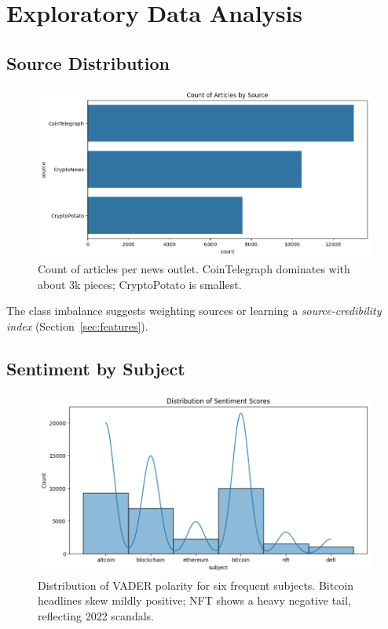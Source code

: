 \documentclass[12pt,a4paper]{article}
\begin{document}
\section{Exploratory Data Analysis}\label{sec:eda}
\subsection{Source Distribution}
\begin{figure}[H]
  \centering
  \includegraphics[width=\linewidth]{output.png}
  \caption{Count of articles per news outlet.  CoinTelegraph dominates
           with about 3k pieces; CryptoPotato is smallest.}
  \label{fig:source}
\end{figure}
The class imbalance suggests weighting sources or learning a
\emph{source-credibility index} (Section~\ref{sec:features}).

\subsection{Sentiment by Subject}
\begin{figure}[H]
  \centering
  \includegraphics[width=.9\linewidth]{output2.png}
  \caption{Distribution of VADER polarity for six frequent subjects.
           Bitcoin headlines skew mildly positive; NFT shows a heavy
           negative tail, reflecting 2022 scandals.}
  \label{fig:sentiment}
\end{figure}
\end{document}
